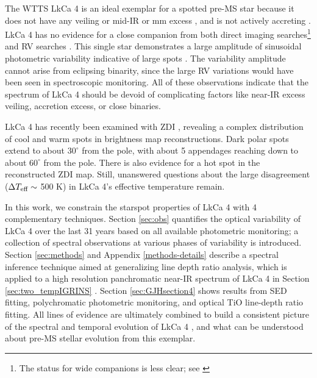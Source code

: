 \documentclass[twocolumn]{emulateapj}%
\newcommand{\name}{LkCa 4 }
\begin{document}
The WTTS LkCa 4 \citep{herbig86,strom89a,downes88,strom89b} is an ideal exemplar for a spotted pre-MS star because it does not have any veiling \citep[\emph{e.g.}][]{hartigan95} or mid-IR or mm excess \citep[\emph{e.g.}][]{andrews05,furlan06,buckle15}, and is not actively accreting \citep[\emph{e.g.}][]{edwards06,cauley12}.  LkCa 4 has no evidence for a close companion from both direct imaging searches\citep{karr10,kraus11,daemgen15}\footnote{The status for wide companions is less clear; see \citet{stauffer91,itoh08,kraus09,kraus11,herczeg14}} and RV searches \citep{nguyen12,donati14}.  This single star demonstrates a large amplitude of sinusoidal photometric variability indicative of large spots \citep{grankin08,xiao12}.  The variability amplitude cannot arise from eclipsing binarity, since the large RV variations would have been seen in spectroscopic monitoring.  All of these observations indicate that the spectrum of \name should be devoid of complicating factors like near-IR excess veiling, accretion excess, or close binaries.    

LkCa 4 has recently been examined with ZDI \citep{donati14}, revealing a complex distribution of cool and warm spots in brightness map reconstructions.  Dark polar spots extend to about $30^\circ$ from the pole, with about 5 appendages reaching down to about $60^\circ$ from the pole.  There is also evidence for a hot spot in the reconstructed ZDI map.  Still, unanswered questions about the large disagreement ($\Delta T_\textrm{eff} \sim$ 500 K) in LkCa 4's effective temperature \citep{herczeg14, donati14} remain.

In this work, we constrain the starspot properties of \name with 4 complementary techniques.  Section \ref{sec:obs} quantifies the optical variability of \name over the last 31 years based on all available photometric monitoring; a collection of spectral observations at various phases of variability is introduced.  Section \ref{sec:methods} and Appendix \ref{methods-details} describe a spectral inference technique aimed at generalizing line depth ratio analysis, which is applied to a high resolution panchromatic near-IR spectrum of \name in Section \ref{sec:two_tempIGRINS} .  Section \ref{sec:GJHsection4} shows results from SED fitting, polychromatic photometric monitoring, and optical TiO line-depth ratio fitting.  All lines of evidence are ultimately combined to build a consistent picture of the spectral and temporal evolution of \name, and what can be understood about pre-MS stellar evolution from this exemplar.
\end{document}
